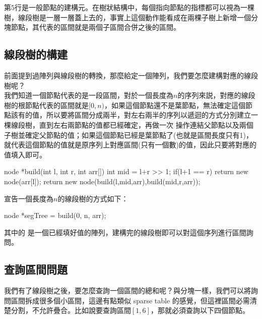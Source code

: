 \documentclass[main.tex]{subfiles}
\begin{document}
第$5$行是一般節點的建構元。在樹狀結構中，每個指向節點的指標都可以視為一棵樹，線段樹是一層一層蓋上去的，事實上這個動作能看成在兩棵子樹上新增一個分塊節點，其代表的區間就是兩個子區間合併之後的區間。

\subsection{線段樹的構建}

前面提到過陣列與線段樹的轉換，那麼給定一個陣列，我們要怎麼建構對應的線段樹呢？\\

我們知道一個節點代表的是一段區間，對於一個長度為$n$的序列來説，對應的線段樹的根節點代表的區間就是$[0,n)$，如果這個節點還不是葉節點，無法確定這個節點該有的值，所以要將區間分成兩半，對左右兩半的序列以遞迴的方式分別建立一棵線段樹，直到左右兩節點的值都已經確定，再做一次  操作連結父節點以及兩個子樹並確定父節點的值；如果這個節點已經是葉節點了(也就是區間長度只有1)，就代表這個節點的值就是原序列上對應區間(只有一個數)的值，因此只要將對應的值填入即可。\\

\begin{C++}
node *build(int l, int r, int arr[]){
    int mid = l+r >> 1;
    if(l+1 == r) return new node(arr[l]);
    return new node(build(l,mid,arr),build(mid,r,arr));
}
\end{C++}


宣告一個長度為$n$的線段樹的方式如下：\\

\begin{C++}
node *segTree = build(0, n, arr);
\end{C++}

其中的  是一個已經填好值的陣列，建構完的線段樹即可以對這個序列進行區間詢問。

\subsection{查詢區間問題}

我們有了線段樹之後，要怎麼查詢一個區間的總和呢？與分塊一樣，我們可以將詢問區間拆成很多個小區間，這邊有點類似 sparse table 的感覺，但這裡區間必需清楚分割，不允許疊合。比如說要查詢區間$[1,6]$，那就必須查詢以下四個節點。\\
\end{document}
